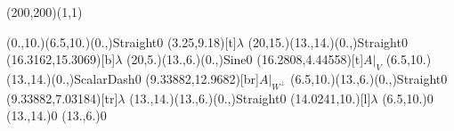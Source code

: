 \unitlength=1bp%

\begin{feynartspicture}(200,200)(1,1)

\FADiagram{}
\FAProp(0.,10.)(6.5,10.)(0.,){Straight}{0}
\FALabel(3.25,9.18)[t]{$\lambda$}
\FAProp(20,15.)(13.,14.)(0.,){Straight}{0}
\FALabel(16.3162,15.3069)[b]{$\lambda$}
\FAProp(20,5.)(13.,6.)(0.,){Sine}{0}
\FALabel(16.2808,4.44558)[t]{$A|_V$}
\FAProp(6.5,10.)(13.,14.)(0.,){ScalarDash}{0}
\FALabel(9.33882,12.9682)[br]{$A|_{W^\perp}$}
\FAProp(6.5,10.)(13.,6.)(0.,){Straight}{0}
\FALabel(9.33882,7.03184)[tr]{$\lambda$}
\FAProp(13.,14.)(13.,6.)(0.,){Straight}{0}
\FALabel(14.0241,10.)[l]{$\lambda$}
\FAVert(6.5,10.){0}
\FAVert(13.,14.){0}
\FAVert(13.,6.){0}
\end{feynartspicture}

